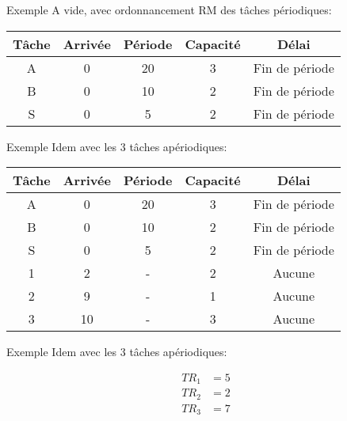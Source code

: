 \begin{frame}{Exemple}
  A vide, avec ordonnancement RM des tâches périodiques:
  \begin{center}
    \begin{tabular}{ccccc}
      \hline
      Tâche & Arrivée & Période & Capacité & Délai \\
      \hline
      A & 0 & 20 & 3 & Fin de période\\
      B & 0 & 10 & 2 & Fin de période\\
      S & 0 &  5 & 2 & Fin de période\\
      \hline
    \end{tabular}
    \pause
    
  \end{center} 
\end{frame} 

\begin{frame}{Exemple}
  Idem avec les 3 tâches apériodiques:
  \begin{center}
    \begin{tabular}{ccccc}
      \hline
      Tâche & Arrivée & Période & Capacité & Délai \\
      \hline
      A &  0 & 20 & 3 & Fin de période\\
      B &  0 & 10 & 2 & Fin de période\\
      S &  0 &  5 & 2 & Fin de période\\
      1 &  2 &  - & 2 & Aucune\\
      2 &  9 &  - & 1 & Aucune\\
      3 & 10 &  - & 3 & Aucune\\
      \hline
    \end{tabular}
    \pause
    
  \end{center}
\end{frame} 

\begin{frame}{Exemple}
  Idem avec les 3 tâches apériodiques:
  \begin{center}
    
    \begin{align*}
      TR_1 &= 5\\
      TR_2 &= 2\\
      TR_3 &= 7\\
    \end{align*}
  \end{center}
\end{frame} 

